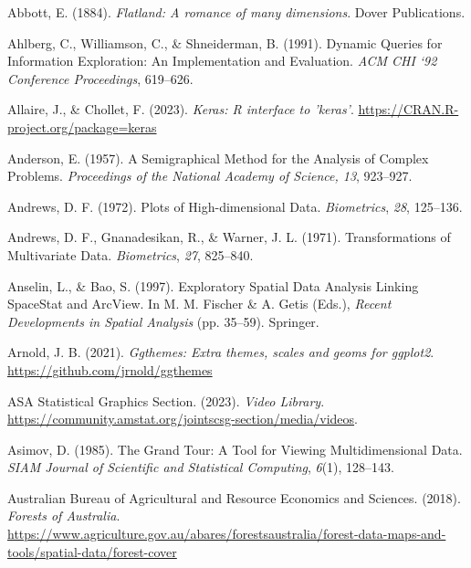 \documentclass[
  letterpaper,
]{krantz}
\newlength{\cslhangindent}
\newenvironment{CSLReferences}[2] %
 {\begin{list}{}{%
  \setlength{\itemindent}{0pt}
  \setlength{\leftmargin}{0pt}
  \setlength{\parsep}{0pt}
  \ifodd #1
   \setlength{\leftmargin}{\cslhangindent}
   \setlength{\itemindent}{-1\cslhangindent}
  \fi
  \setlength{\itemsep}{#2\baselineskip}}}
 {\end{list}}
\begin{document}
\label{refs}
\begin{CSLReferences}{1}{0}
Abbott, E. (1884). \emph{Flatland: A romance of many dimensions}. Dover
Publications.

Ahlberg, C., Williamson, C., \& Shneiderman, B. (1991). Dynamic
{Q}ueries for {I}nformation {E}xploration: {A}n {I}mplementation and
{E}valuation. \emph{ACM CHI `92 Conference Proceedings}, 619--626.

Allaire, J., \& Chollet, F. (2023). \emph{Keras: R interface to
'keras'}. \url{https://CRAN.R-project.org/package=keras}

Anderson, E. (1957). A {S}emigraphical {M}ethod for the {A}nalysis of
{C}omplex {P}roblems. \emph{Proceedings of the National Academy of
Science, 13}, 923--927.

Andrews, D. F. (1972). {P}lots of {H}igh-dimensional {D}ata.
\emph{Biometrics}, \emph{28}, 125--136.

Andrews, D. F., Gnanadesikan, R., \& Warner, J. L. (1971).
{T}ransformations of {M}ultivariate {D}ata. \emph{Biometrics},
\emph{27}, 825--840.

Anselin, L., \& Bao, S. (1997). {E}xploratory {S}patial {D}ata
{A}nalysis {L}inking {S}pace{S}tat and {A}rc{V}iew. In M. M. Fischer \&
A. Getis (Eds.), \emph{{R}ecent {D}evelopments in {S}patial {A}nalysis}
(pp. 35--59). Springer.

Arnold, J. B. (2021). \emph{Ggthemes: Extra themes, scales and geoms for
ggplot2}. \url{https://github.com/jrnold/ggthemes}

ASA Statistical Graphics Section. (2023). \emph{Video {L}ibrary}.
\url{https://community.amstat.org/jointscsg-section/media/videos}.

Asimov, D. (1985). {T}he {G}rand {T}our: {A} {T}ool for {V}iewing
{M}ultidimensional {D}ata. \emph{SIAM Journal of Scientific and
Statistical Computing}, \emph{6}(1), 128--143.

Australian Bureau of Agricultural and Resource Economics and Sciences.
(2018). \emph{{Forests of Australia}}.
\url{https://www.agriculture.gov.au/abares/forestsaustralia/forest-data-maps-and-tools/spatial-data/forest-cover}


\end{CSLReferences}
\end{document}
